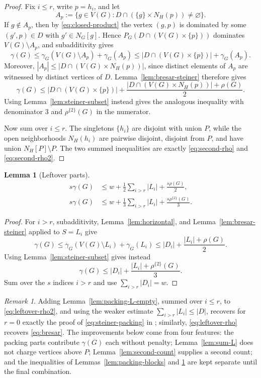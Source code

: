 \documentclass[10pt]{amsart}
\newtheorem{lemma}[theorem]{Lemma}
\theoremstyle{remark}
\newtheorem{remark}[theorem]{Remark}
\newcommand{\N}{N}
\newcommand{\V}{V}
\newcommand{\PG}{P_G}
\newcommand{\rhoTwo}{\rho^{\{2\}}}
\begin{document}
\begin{proof}
Fix $i\leq r$, write $p=h_i$, and let
\[
 A_p:=\{g\in\V(G):D\cap(\{g\}\times\N_H(p))\neq\varnothing\}.
\]
If $g\notin A_p$, then by \eqref{eq:closed-product} the vertex $(g,p)$ is
dominated by some $(g',p)\in D$ with $g'\in\N_G[g]$. Hence
$\PG(D\cap(\V(G)\times\{p\}))$ dominates $\V(G)\setminus A_p$, and
subadditivity gives
\[
 \gamma(G)
 \leq \gamma_G(\V(G)\setminus A_p)+\gamma_G(A_p)
 \leq |D\cap(\V(G)\times\{p\})|+\gamma_G(A_p).
\]
Moreover,
$|A_p|\leq|D\cap(\V(G)\times\N_H(p))|$, since distinct elements of $A_p$
are witnessed by distinct vertices of $D$. Lemma~\ref{lem:bresar-steiner}
therefore gives
\[
 \gamma(G)
 \leq |D\cap(\V(G)\times\{p\})|
 +\frac{|D\cap(\V(G)\times\N_H(p))|+\rho(G)}2.
\]
Using Lemma~\ref{lem:steiner-subset} instead gives the analogous inequality
with denominator $3$ and $\rhoTwo(G)$ in the numerator.

Now sum over $i\leq r$. The singletons $\{h_i\}$ are disjoint with union
$P$, while the open neighborhoods $\N_H(h_i)$ are pairwise disjoint, disjoint
from $P$, and have union $\N_H[P]\setminus P$. The two summed inequalities
are exactly \eqref{eq:second-rho} and \eqref{eq:second-rho2}.
\end{proof}

\begin{lemma}[Leftover parts]\label{lem:leftover}
\begin{align}
 s\gamma(G)&\leq w+\frac12\sum_{i>r}|L_i|+\frac{s\rho(G)}2,
 \label{eq:leftover-rho}\\
 s\gamma(G)&\leq w+\frac13\sum_{i>r}|L_i|+\frac{s\rhoTwo(G)}3.
 \label{eq:leftover-rho2}
\end{align}
\end{lemma}

\begin{proof}
For $i>r$, subadditivity, Lemma~\ref{lem:horizontal}, and
Lemma~\ref{lem:bresar-steiner} applied to $S=L_i$ give
\[
 \gamma(G)
 \leq\gamma_G(\V(G)\setminus L_i)+\gamma_G(L_i)
 \leq|D_i|+\frac{|L_i|+\rho(G)}2.
\]
Using Lemma~\ref{lem:steiner-subset} gives instead
\[
 \gamma(G)\leq|D_i|+\frac{|L_i|+\rhoTwo(G)}3.
\]
Sum over the $s$ indices $i>r$ and use $\sum_{i>r}|D_i|=w$.
\end{proof}

\begin{remark}\label{rem:recover-old}
Adding Lemma~\ref{lem:packing-L-empty}, summed over $i\leq r$, to
\eqref{eq:leftover-rho2}, and using the weaker estimate
$\sum_{i>r}|L_i|\leq|D|$, recovers for $r=0$ exactly the proof of
\eqref{eq:steiner-packing} in \cite{Steiner2026}; similarly,
\eqref{eq:leftover-rho} recovers \eqref{eq:bresar}. The improvements below
come from four features: the packing parts contribute $\gamma(G)$ each without
penalty; Lemma~\ref{lem:sum-L} does not charge vertices above $P$;
Lemma~\ref{lem:second-count} supplies a second count; and the inequalities of
Lemmas~\ref{lem:packing-blocks} and \ref{lem:leftover} are kept separate until
the final combination.
\end{remark}
\end{document}
